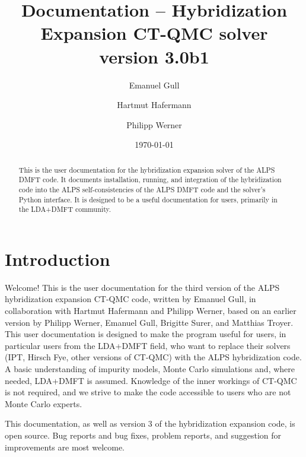 \documentclass[aps,prb,floatfix,superscriptaddress,twocolumn,notitlepage]{revtex4-1}
\begin{document}
\newcommand{\Emanuel}{\href{mailto:gull@pks.mpg.de}{Emanuel }}
\title{Documentation -- Hybridization Expansion CT-QMC solver\\ version 3.0b1}
\author{Emanuel Gull}
\author{Hartmut Hafermann}
\author{Philipp Werner}
\date{\today }

\begin{abstract}
This is the user documentation for the hybridization expansion solver of the ALPS DMFT code. It documents installation, running, and integration of the hybridization code into the ALPS self-consistencies of the ALPS DMFT code and the solver's Python interface. It is designed to be a useful documentation for users, primarily in the LDA+DMFT community.
\end{abstract}

\maketitle

\section{Introduction}
Welcome! This is the user documentation for the third version of the ALPS\cite{ALPS20} hybridization expansion\cite{Werner06} CT-QMC\cite{Gull11_review} code, written by Emanuel Gull, in collaboration with Hartmut Hafermann and Philipp Werner, based on an earlier version\cite{ALPS_DMFT} by Philipp Werner, Emanuel Gull, Brigitte Surer, and Matthias Troyer. This user documentation is designed to make the program useful for users, in particular users from the LDA+DMFT field, who want to replace their solvers (IPT, Hirsch Fye, other versions of CT-QMC) with the ALPS hybridization code. A basic understanding of impurity models, Monte Carlo simulations and, where needed, LDA+DMFT is assumed. Knowledge of the inner workings of CT-QMC is not required, and we strive to make the code accessible to users who are not Monte Carlo experts.

This documentation, as well as version $3$ of the hybridization expansion code, is open source. Bug reports and bug fixes, problem reports, and suggestion for improvements are most welcome.
\end{document}
